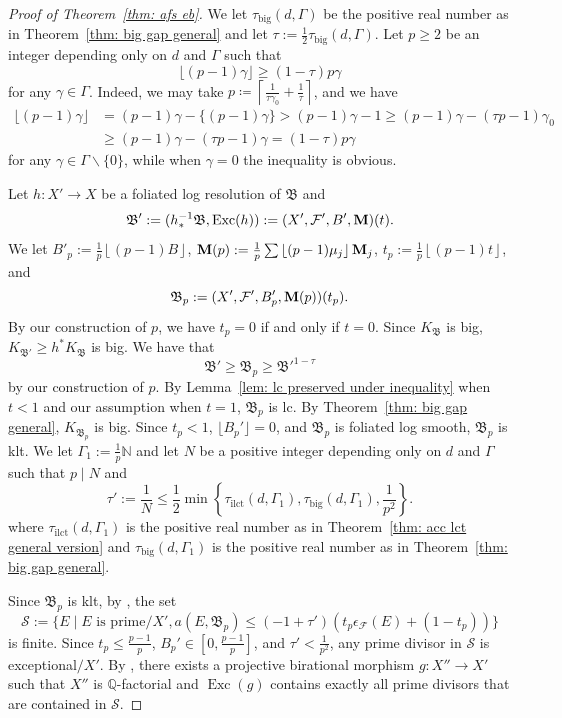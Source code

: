 \documentclass[11pt,reqno]{amsart}
\numberwithin{equation}{section}
\newcommand{\Mm}{{\bf{M}}}
\newcommand{\Exc}{\operatorname{Exc}}
\newcommand{\ilct}{\operatorname{ilct}}
\newcommand{\gt}{\operatorname{big}}
\newcommand{\Bb}{{\mathfrak{B}}}
\newcommand{\Ff}{\mathcal{F}}
\newcommand{\Ii}{\Gamma}
\theoremstyle{definition}
\begin{document}
\begin{proof}[Proof of Theorem~\ref{thm: afs eb}]
We let $\tau_{\gt}(d,\Ii)$ be the positive real number as in Theorem~\ref{thm: big gap general} and let $\tau:=\frac{1}{2}\tau_{\gt}(d,\Ii)$. Let $p\geq 2$ be an integer depending only on $d$ and $\Ii$ such that 
$$\lfloor (p-1)\gamma\rfloor\geq (1-\tau)p\gamma$$ 
for any $\gamma\in\Ii$. Indeed, we may take 
$p\coloneqq \left\lceil\frac{1}{\tau\gamma_0}+\frac{1}{\tau}\right\rceil$, and we have
\begin{align*}
   \lfloor (p-1)\gamma\rfloor&=(p-1)\gamma-\{(p-1)\gamma\}>(p-1)\gamma-1\geq (p-1)\gamma-(\tau p-1)\gamma_0\\
   &\geq (p-1)\gamma-(\tau p-1)\gamma=(1-\tau)p\gamma
\end{align*}
for any $\gamma\in\Ii\backslash\{0\}$, while when $\gamma=0$ the inequality is obvious.

Let $h\colon X'\rightarrow X$ be a foliated log resolution of $\Bb$ and
$$\Bb':=(h^{-1}_*\Bb,\Exc(h)):=(X',\Ff',B',\Mm)(t).$$
We let $B'_p:=\frac{1}{p}\left\lfloor (p-1)B\right\rfloor$, $\Mm(p):=\frac{1}{p}\sum\left\lfloor (p-1)\mu_j\right\rfloor\Mm_j$, $t_p:=\frac{1}{p}\left\lfloor (p-1)t\right\rfloor$, and
$$\Bb_p:=(X',\Ff',B'_p,\Mm(p))(t_p).$$
By our construction of $p$, we have $t_p=0$ if and only if $t=0$. Since $K_{\Bb}$ is big, $K_{\Bb'}\geq h^*K_{\Bb}$ is big. We have that
$$\Bb'\geq\Bb_p\geq\Bb'^{1-\tau}$$
by our construction of $p$. By Lemma~\ref{lem: lc preserved under inequality} when $t<1$ and our assumption when $t=1$, $\Bb_p$ is lc. By Theorem~\ref{thm: big gap general}, $K_{\Bb_p}$ is big. Since $t_p<1$, $\lfloor B_p'\rfloor=0$, and $\Bb_p$ is foliated log smooth, $\Bb_p$ is klt. We let $\Ii_1:=\frac{1}{p}\mathbb N$ and let $N$ be a positive integer depending only on $d$ and $\Ii$ such that $p\mid N$ and
$$\tau':=\frac{1}{N}\leq\frac{1}{2}\min\left\{\tau_{\ilct}(d,\Ii_1),\tau_{\gt}(d,\Ii_1),\frac{1}{p^2}\right\}.$$ 
where $\tau_{\ilct}(d,\Ii_1)$ is the positive real number as in Theorem~\ref{thm: acc lct general version} and $\tau_{\gt}(d,\Ii_1)$ is the positive real number as in Theorem~\ref{thm: big gap general}. 

Since $\Bb_p$ is klt, by \cite[Lemma~2.13]{CLW26}, the set
$$\mathcal{S}:=\{E\mid E\text{ is prime}/X', a(E,\Bb_p)\leq (-1+\tau')(t_p\epsilon_{\Ff}(E)+(1-t_p))\}$$
is finite. Since $t_p\leq\frac{p-1}{p}$, $B_p'\in [0,\frac{p-1}{p}]$, and $\tau'<\frac{1}{p^2}$, any prime divisor in $\mathcal{S}$ is exceptional$/X'$. By \cite[Theorem~2.2.3]{Cas+25a}, there exists a projective birational morphism $g: X''\rightarrow X'$ such that $X''$ is $\mathbb Q$-factorial and $\Exc(g)$ contains exactly all prime divisors that are contained in $\mathcal{S}$. 


\end{proof}
\end{document}
